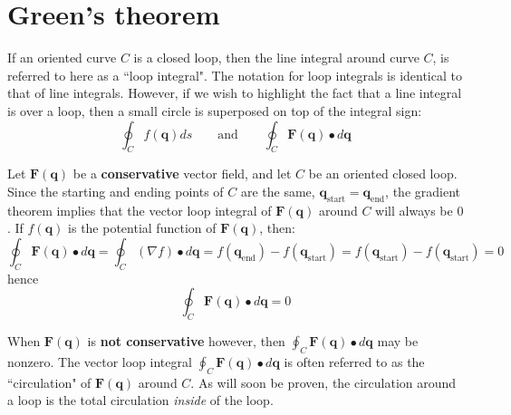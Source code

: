 \documentclass{article}
\begin{document}
\begin{itemize}
\end{itemize}



\section*{Green's theorem}

If an oriented curve \(C\) is a closed loop, then the line integral around curve \(C\), is referred to here as a ``loop integral". The notation for loop integrals is identical to that of line integrals. However, if we wish to highlight the fact that a line integral is over a loop, then a small circle is superposed on top of the integral sign:
\[\oint_C f(\mathbf{q})ds \quad\quad\text{and}\quad\quad \oint_C \mathbf{F}(\mathbf{q}) \bullet d\mathbf{q}\]   

Let \(\mathbf{F}(\mathbf{q})\) be a {\bf conservative} vector field, and let \(C\) be an oriented closed loop. Since the starting and ending points of \(C\) are the same, \(\mathbf{q}_{\text{start}} = \mathbf{q}_{\text{end}}\), the gradient theorem implies that the vector loop integral of \(\mathbf{F}(\mathbf{q})\) around \(C\) will always be \(0\). If \(f(\mathbf{q})\) is the potential function of \(\mathbf{F}(\mathbf{q})\), then:
\[\oint_C \mathbf{F}(\mathbf{q}) \bullet d\mathbf{q} = \oint_C (\nabla f) \bullet d\mathbf{q} = f(\mathbf{q}_{\text{end}}) - f(\mathbf{q}_{\text{start}}) = f(\mathbf{q}_{\text{start}}) - f(\mathbf{q}_{\text{start}}) = 0\] 
hence
\[\oint_C \mathbf{F}(\mathbf{q}) \bullet d\mathbf{q} = 0\] 

When \(\mathbf{F}(\mathbf{q})\) is {\bf not conservative} however, then \(\oint_C \mathbf{F}(\mathbf{q}) \bullet d\mathbf{q}\) may be nonzero. The vector loop integral \(\oint_C \mathbf{F}(\mathbf{q}) \bullet d\mathbf{q}\) is often referred to as the ``circulation" of \(\mathbf{F}(\mathbf{q})\) around \(C\). As will soon be proven, the circulation around a loop is the total circulation \emph{inside} of the loop.
\end{document}
